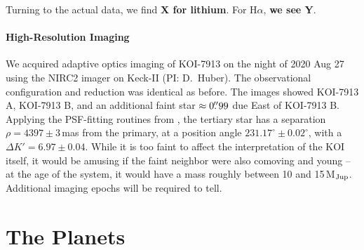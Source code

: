 \documentclass[12pt,twocolumn,linenumbers]{aastex63}
\begin{document}
Turning to the actual data, we find {\bf X for lithium}.
For H$\alpha$, {\bf we see Y}.

% 
% 

\paragraph{High-Resolution Imaging}

We acquired adaptive optics imaging of KOI-7913 on the night of 2020
Aug 27 using the NIRC2 imager on Keck-II (PI: D.~Huber).  The
observational configuration and reduction was identical as before.
The images showed KOI-7913 A, KOI-7913 B, and an additional faint star
$\approx0\mbox{$.\!\!^{\prime\prime}$}99$ due East of KOI-7913 B.  Applying the PSF-fitting
routines from \citet{kraus_impact_2016}, the tertiary star has a
separation $\rho = 4397 \pm 3$\,mas from the primary, at a position
angle $231.17^\circ \pm 0.02^\circ$, with a $\Delta K' = 6.97 \pm
0.04$.  While it is too faint to affect the interpretation of the KOI
itself, it would be amusing if the faint neighbor were also comoving
and young -- at the age of the system, it would have a mass roughly
between 10 and 15\,M$_{\rm Jup}$.  Additional imaging epochs will be
required to tell.




\section{The Planets}
\label{sec:planets}
\end{document}
